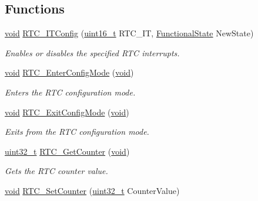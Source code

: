 \subsection*{Functions}
\begin{DoxyCompactItemize}
\item 
\hyperlink{usb__devapi_8h_afabf60e7f57651d6d595a02c75f07cd0}{void} \hyperlink{group___r_t_c___exported___functions_ga175dfe88866234730c1ec40d2221c4f4}{R\+T\+C\+\_\+\+I\+T\+Config} (\hyperlink{_p_e___types_8h_a1f1825b69244eb3ad2c7165ddc99c956}{uint16\+\_\+t} R\+T\+C\+\_\+\+IT, \hyperlink{agilefox_2library_2inc_2stm32f10x__type_8h_ac9a7e9a35d2513ec15c3b537aaa4fba1}{Functional\+State} New\+State)
\begin{DoxyCompactList}\small\item\em Enables or disables the specified R\+TC interrupts. \end{DoxyCompactList}\item 
\hyperlink{usb__devapi_8h_afabf60e7f57651d6d595a02c75f07cd0}{void} \hyperlink{group___r_t_c___exported___functions_ga23612d9da2fe057a0cd72c684e5b438a}{R\+T\+C\+\_\+\+Enter\+Config\+Mode} (\hyperlink{usb__devapi_8h_afabf60e7f57651d6d595a02c75f07cd0}{void})
\begin{DoxyCompactList}\small\item\em Enters the R\+TC configuration mode. \end{DoxyCompactList}\item 
\hyperlink{usb__devapi_8h_afabf60e7f57651d6d595a02c75f07cd0}{void} \hyperlink{group___r_t_c___exported___functions_ga7585aa6e2dbb497173b2fd03bac0d304}{R\+T\+C\+\_\+\+Exit\+Config\+Mode} (\hyperlink{usb__devapi_8h_afabf60e7f57651d6d595a02c75f07cd0}{void})
\begin{DoxyCompactList}\small\item\em Exits from the R\+TC configuration mode. \end{DoxyCompactList}\item 
\hyperlink{_p_e___types_8h_a33594304e786b158f3fb30289278f5af}{uint32\+\_\+t} \hyperlink{group___r_t_c___exported___functions_ga6edb19a0ad8414a40610341121c5ea6c}{R\+T\+C\+\_\+\+Get\+Counter} (\hyperlink{usb__devapi_8h_afabf60e7f57651d6d595a02c75f07cd0}{void})
\begin{DoxyCompactList}\small\item\em Gets the R\+TC counter value. \end{DoxyCompactList}\item 
\hyperlink{usb__devapi_8h_afabf60e7f57651d6d595a02c75f07cd0}{void} \hyperlink{group___r_t_c___exported___functions_gafa81ec17158de1d1a7740eca81b9fb65}{R\+T\+C\+\_\+\+Set\+Counter} (\hyperlink{_p_e___types_8h_a33594304e786b158f3fb30289278f5af}{uint32\+\_\+t} Counter\+Value)

\end{DoxyCompactItemize}
